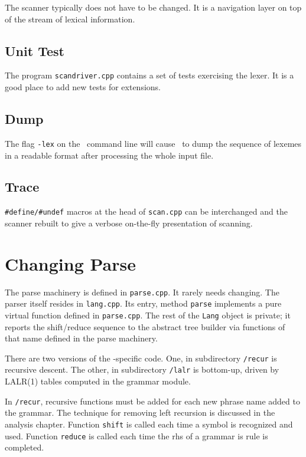 The scanner typically does not have to be changed.  It is a navigation layer on top of the stream of lexical information.

\subsection{Unit Test}

The program {\tt scandriver.cpp} contains a set of tests exercising the lexer.
It is a good place to add new tests for extensions.

\subsection{Dump}

The flag {\tt-lex} on the \xcom\ command line will cause \xcom\ to dump the sequence of lexemes in a readable format after processing the whole input file.

\subsection{Trace}

{\tt #define/#undef} macros at the head of {\tt scan.cpp} can be interchanged and the scanner rebuilt to give a verbose on-the-fly presentation of scanning.

\section{Changing Parse}

The parse machinery is defined in {\tt parse.cpp}.  It rarely needs changing.
The parser itself resides in {\tt lang.cpp}.  Its entry, method {\tt parse} implements a pure virtual function defined in {\tt parse.cpp}.  The rest of the {\tt Lang} object is private; it reports the shift/reduce sequence to the abstract tree builder via functions of that name defined in the parse machinery.

There are two versions of the -specific code.  One, in subdirectory {\tt /recur} is recursive descent.  The other, in subdirectory {\tt /lalr} is bottom-up, driven by LALR(1) tables computed in the grammar module.

In {\tt /recur}, recursive functions must be added for each new phrase name added to the  grammar.  The technique for removing left recursion is discussed in the analysis chapter.  Function {\tt shift} is called each time a symbol is recognized and used.  Function {\tt reduce} is called each time the rhs of a grammar is rule is completed.

